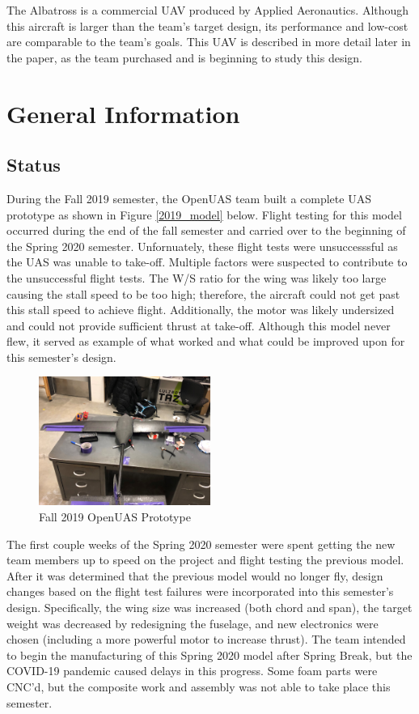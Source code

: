 \documentclass{article}
\begin{document}
\noindent The Albatross is a commercial UAV produced by Applied Aeronautics. Although this aircraft is larger than the team's target design, its performance and low-cost are comparable to the team's goals. This UAV is described in more detail later in the paper, as the team purchased and is beginning to study this design. \\


\section{General Information}

\subsection{Status}
During the Fall 2019 semester, the OpenUAS team built a complete UAS prototype as shown in Figure \ref{2019_model} below. Flight testing for this model occurred during the end of the fall semester and carried over to the beginning of the Spring 2020 semester. Unfornuately, these flight tests were unsuccesssful as the UAS was unable to take-off. Multiple factors were suspected to contribute to the unsuccessful flight tests. The W/S ratio for the wing was likely too large causing the stall speed to be too high; therefore, the aircraft could not get past this stall speed to achieve flight. Additionally, the motor was likely undersized and could not provide sufficient thrust at take-off. Although this model never flew, it served as example of what worked and what could be improved upon for this semester's design.

\begin{figure}[hbt!]
\centering
\includegraphics[width=0.5\textwidth]{OpenUAS_Fall2019_Model.jpg}
\caption{Fall 2019 OpenUAS Prototype}
\label{fig:2019_model}
\end{figure}

The first couple weeks of the Spring 2020 semester were spent getting the new team members up to speed on the project and flight testing the previous model. After it was determined that the previous model would no longer fly, design changes based on the flight test failures were incorporated into this semester's design. Specifically, the wing size was increased (both chord and span), the target weight was decreased by redesigning the fuselage, and new electronics were chosen (including a more powerful motor to increase thrust). The team intended to begin the manufacturing of this Spring 2020 model after Spring Break, but the COVID-19 pandemic caused delays in this progress. Some foam parts were CNC'd, but the composite work and assembly was not able to take place this semester. 
\end{document}
